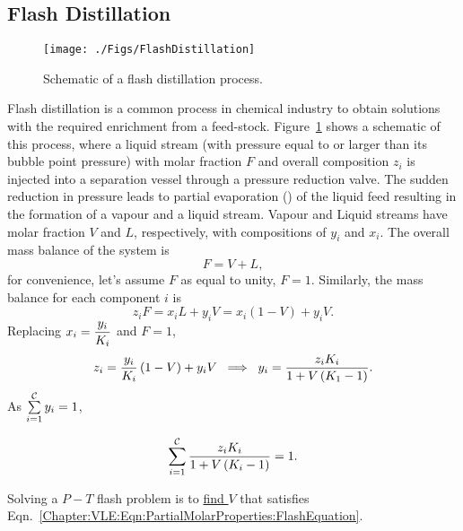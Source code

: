 \subsection{Flash Distillation}\label{Chapter:VLE:Section:FlashDistillation}
  \begin{figure}[h]
     \begin{center}
         \texttt{[image: ./Figs/FlashDistillation]}
     \end{center}
     \caption{Schematic of a flash distillation process.}\label{Chapter:VLE:Fig:Fig06}
  \end{figure}
Flash distillation is a common process in chemical industry to obtain solutions with the required enrichment from a feed-stock. Figure~\ref{Chapter:VLE:Fig:Fig06} shows a schematic of this process, where a liquid stream (\ie with pressure equal to or larger than its bubble point pressure) with molar fraction $F$ and overall composition $z_{i}$ is injected into a separation vessel through a pressure reduction valve. The sudden reduction in pressure leads to partial evaporation () of the liquid feed resulting in the formation of a vapour and a liquid stream. Vapour and Liquid streams have molar fraction $V$ and $L$, respectively, with compositions of $y_{i}$ and $x_{i}$. 
  The overall mass balance of the system is
  \begin{displaymath}
     F = V + L,
  \end{displaymath}
  for convenience, let's assume $F$ as equal to unity, $F=1$. Similarly, the mass balance for each component $i$ is
  \begin{displaymath}
     z_{i}F = x_{i}L + y_{i}V = x_{i}\left(1-V\right) + y_{i}V.
  \end{displaymath}
  Replacing $x_{i} = \frc{y_{i}}{K_{i}}$ and $F=1$,
  \begin{displaymath}
     z_{i} = \frc{y_{i}}{K_{i}}\left(1-V\right) + y_{i}V \;\;\Longrightarrow \;\;y_{i} = \frc{z_{i}K_{i}}{1+V\left(K_{1}-1\right)}. 
  \end{displaymath}
  As $\summation[y_{i}]{i=1}{\mathcal{C}} = 1$,
         \begin{shaded}
           \begin{equation}
              \summation[\frc{z_{i}K_{i}}{1+V\left(K_{i}-1\right)}]{i=1}{\mathcal{C}} = 1.\label{Chapter:VLE:Eqn:PartialMolarProperties:FlashEquation} 
           \end{equation}
         \end{shaded}
         Solving a $P-T$ flash problem is to \underline{find $V$} that satisfies Eqn.~\ref{Chapter:VLE:Eqn:PartialMolarProperties:FlashEquation}.

